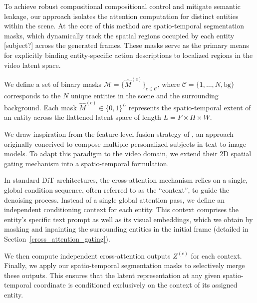 \documentclass{article}
\begin{document}
To achieve robust compositional compositional control and mitigate semantic leakage, our approach isolates the attention computation for distinct entities within the scene. At the core of this method are spatio-temporal segmentation masks, which dynamically track the spatial regions occupied by each entity [subject?] across the generated frames. These masks serve as the primary means for explicitly binding entity-specific action descriptions to localized regions in the video latent space.

We define a set of binary masks $\mathcal{M} = \{ \hat{M}^{(c)}\}_{c \in \mathcal{C}}$, where $\mathcal{C} = \{1, \dots, N, \text{bg}\}$ corresponds to the $N$ unique entities in the scene and the surrounding background.
Each mask $\hat{M}^{(c)} \in \{0, 1\}^L$ represents the spatio-temporal extent of an entity across the flattened latent space of length $L = F \times H \times W$.


We draw inspiration from the feature-level fusion strategy of \citet{kwonConceptWeaverEnabling2024}, an approach originally conceived to compose multiple personalized subjects in text-to-image models. To adapt this paradigm to the video domain, we extend their 2D spatial gating mechanism into a spatio-temporal formulation.

In standard DiT architectures, the cross-attention mechanism relies on a single, global condition sequence, often referred to as the ``context'', to guide the denoising process. Instead of a single global attention pass, we define an independent conditioning context for each entity. This context comprises the entity's specific text prompt as well as its visual embeddings, which we obtain by masking and inpainting the surrounding entities in the initial frame (detailed in Section~\ref{cross_attention_gating}).


We then compute independent cross-attention outputs $Z^{(c)}$ for each context. Finally, we apply our spatio-temporal segmentation masks to selectively merge these outputs. This ensures that the latent representation at any given spatio-temporal coordinate is conditioned exclusively on the context of its assigned entity.
\end{document}
